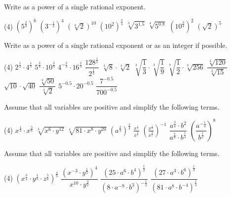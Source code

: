 \begin{exercise}
	Write as a power of a single rational exponent.
	\begin{tasks}(4)
		\task $\left(5^{\frac{2}{3}}\right)^6$
		\task $\left(3^{-\frac{1}{2}}\right)^4$
		\task $\left(\sqrt[4]{2}\right)^{10}$
		\task $\left(10^2\right)^\frac{3}{4}$
		\task $\sqrt[3]{3^{1.5}}$
		\task $\sqrt[4]{5^{0.8}}$
		\task $\left(10^{\frac{3}{4}}\right)^2$
		\task $\left(\sqrt{2}\right)^5$
	\end{tasks}
\end{exercise}
\pagebreak[4]
\begin{exercise}
	Write as a power of a single rational exponent or as an integer if possible.
	\begin{tasks}(4)
		\task $2^\frac{1}{3}\cdot 4^\frac{1}{3}$
		\task $5^{\frac{3}{4}}\cdot 10^\frac{3}{4}$
		\task $4^{-\frac{2}{3}}\cdot 16^\frac{2}{3}$
		\task $\dfrac{128^\frac{1}{3}}{2^\frac{1}{3}}$
		\task $\sqrt[4]{8}\cdot\sqrt[4]{2}$
		\task $\sqrt[3]{\dfrac{1}{3}}\cdot\sqrt[3]{\dfrac{1}{9}}$
		\task $\sqrt[7]{\dfrac{1}{2}}\cdot\sqrt[7]{256}$
		\task $\dfrac{\sqrt[3]{120}}{\sqrt[3]{15}}$
		\task $\sqrt{10}\cdot\sqrt{40}$
		\task $\dfrac{\sqrt[4]{50}}{\sqrt[4]{2}}$
		\task $5^{-0.5}\cdot 20^{-0.5}$
		\task $\dfrac{7^{-0.5}}{700^{-0.5}}$
	\end{tasks}
\end{exercise}
\begin{exercise}
	Assume that all variables are positive and simplify the following terms.
	\begin{tasks}(4)
		\task $x^{\frac{1}{3}}\cdot x^{\frac{5}{6}}$
		\task $\sqrt[3]{x^6\cdot y^{12}}$
		\task $\sqrt[4]{81\cdot x^8\cdot y^{20}}$
		\task $\left(a^{\frac{2}{3}}\right)^\frac{3}{4}$
		\task $\frac{x^{\frac{1}{5}}}{x^{\frac{3}{5}}}$
		\task $\left(\frac{x^{\frac{1}{5}}}{x^{\frac{3}{5}}}\right)^{-1}$
		\task $\dfrac{a^{\frac{3}{4}}\cdot b^2}{a^\frac{7}{8}\cdot b^\frac{1}{4}}$
		\task $\left(\dfrac{a^{-\frac{1}{4}}}{b^\frac{1}{2}}\right)^8$
	\end{tasks}
\end{exercise}
\begin{exercise}
	Assume that all variables are positive and simplify the following terms.
	\begin{tasks}(4)
		\task $\left(x^\frac{3}{4}\cdot y^\frac{1}{8}\cdot z^\frac{5}{6}\right)^\frac{4}{5}$
		\task $\dfrac{\left(x^{-3}\cdot y^{\frac{1}{2}}\right)^4}{x^{10}\cdot y^{\frac{3}{2}}}$
		\task $\dfrac{\left(25\cdot a^6\cdot b^4\right)^\frac{1}{2}}{\left(8\cdot a^{-9}\cdot b^3\right)^{-\frac{1}{2}}}$
		\task $\dfrac{\left(27\cdot a^3\cdot b^6\right)^\frac{1}{3}}{\left(81\cdot a^8\cdot b^{-4}\right)^\frac{1}{4}}$
	\end{tasks}
\end{exercise}